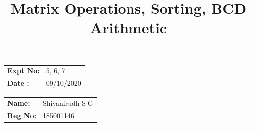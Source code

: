 \documentclass[10pt,a4paper]{article}
\title{\bf Matrix Operations, Sorting, BCD Arithmetic}
\author{\vspace{-10ex}}
\date{\vspace{-10ex}}
\begin{document}
\maketitle

\begin{minipage}{0.45\textwidth}
        \begin{tabular}{l l}
            \textbf{Expt No:}&5, 6, 7\\
            \textbf{Date :}&09/10/2020
        \end{tabular}
\end{minipage}%
\begin{minipage}{0.45\textwidth}
        \begin{tabular}{l l}
             \textbf{Name:}& Shivanirudh S G  \\
             \textbf{Reg No:} & 185001146 
        \end{tabular}
\end{minipage}
\vspace{1cm}
\hrule
\end{document}
